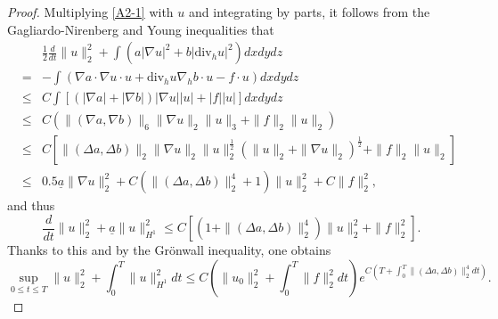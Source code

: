 \documentclass[12pt,reqno]{amsart}
\numberwithin{equation}{section}
\begin{document}
\begin{proof}
  Multiplying \eqref{A2-1} with $u$ and integrating by parts, it follows from the Gagliardo-Nirenberg and Young inequalities that
  \begin{eqnarray*}
    &&\frac12\frac{d}{dt}\|u\|_2^2+\int(a|\nabla u|^2+b|\text{div}_hu|^2)dxdydz\\
    &=&-\int(\nabla a\cdot\nabla u\cdot u+\text{div}_hu\nabla_hb\cdot u-f\cdot u)dxdydz\\
    &\leq&C\int[(|\nabla a|+|\nabla b|)|\nabla u||u|+|f||u|]dxdydz\\
    &\leq&C(\|(\nabla a,\nabla b)\|_6\|\nabla u\|_2\|u\|_3+\|f\|_2\|u\|_2)\\
    &\leq&C\left[\|(\Delta a,\Delta b)\|_2\|\nabla u\|_2\|u\|_2^\frac12\left(\|u\|_2+\|\nabla u\|_2\right)^\frac12+\|f\|_2\|u\|_2\right]\\
    &\leq&0.5\underline a\|\nabla u\|_2^2+C\left(\|(\Delta a,\Delta b)\|_2^4+1\right)\|u\|_2^2+C\|f\|_2^2 ,
  \end{eqnarray*}
  and thus
  \begin{equation*}
    \frac{d}{dt}\|u\|_2^2+\underline a\|u\|_{H^1}^2\leq C\left[\left(1+\|(\Delta a, \Delta b)\|_2^4\right)\|u\|_2^2+\|f\|_2^2\right].
  \end{equation*}
  Thanks to this and by the Gr\"onwall inequality, one obtains
  \begin{equation*}
    \sup_{0\leq t\leq T}\|u\|_2^2+\int_0^T\|u\|_{H^1}^2dt\leq C\left(\|u_0\|_2^2+\int_0^T\|f\|_2^2dt\right)e^{C\left(T+\int_0^T\|(\Delta a,\Delta b)\|_2^4dt\right)}.\label{ESTU}
  \end{equation*}


\end{proof}
\end{document}
